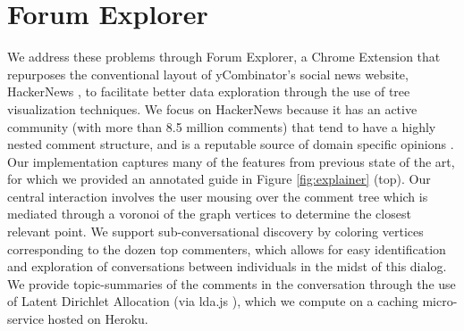 \documentclass{egpubl}
\begin{document}







\section{Forum Explorer}

We address these problems through Forum Explorer, a Chrome Extension that repurposes the conventional layout of yCombinator's social news website, HackerNews \cite{hackernews}, to facilitate better data exploration through the use of tree visualization techniques.
%
We focus on HackerNews because it has an active community (with more than 8.5 million comments) that tend to have a highly nested comment structure, and is a reputable source of domain specific opinions \cite{barik2015heart}.
%
Our implementation captures many of the features from previous state of the art, for which we provided an annotated guide in Figure \ref{fig:explainer} (top). 
%
Our central interaction involves the user mousing over the comment tree which is mediated through a voronoi of the graph vertices to determine the closest relevant point.
%
We support sub-conversational discovery by coloring vertices corresponding to the dozen top commenters, which allows for easy identification and exploration of conversations between individuals in the midst of this dialog.
%
%
We provide topic-summaries of the comments in the conversation through the use of Latent Dirichlet Allocation (via lda.js \cite{lda-js}), which we compute on a caching micro-service hosted on Heroku. 
%
\end{document}
